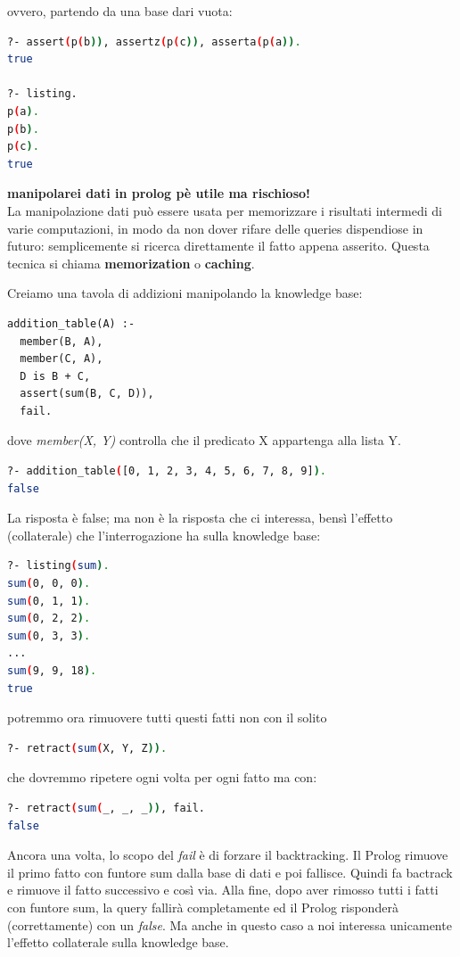 \documentclass[a4paper,12pt, oneside]{book}
\begin{document}
ovvero, partendo da una base dari vuota:
\begin{shaded}
\begin{lstlisting}[language=bash]
?- assert(p(b)), assertz(p(c)), asserta(p(a)).
true

?- listing.
p(a).
p(b).
p(c).
true
\end{lstlisting}
\end{shaded}
\textbf{manipolarei dati in prolog pè utile ma rischioso!}\\
La manipolazione dati può essere usata per memorizzare i risultati
intermedi di varie computazioni, in modo da non dover rifare
delle queries dispendiose in futuro: semplicemente si ricerca
direttamente il fatto appena asserito. Questa tecnica si chiama \textbf{memorization} o \textbf{caching}.
\begin{esempio}
Creiamo una tavola di addizioni manipolando la knowledge base:
\begin{verbatim}
addition_table(A) :-
  member(B, A),
  member(C, A),
  D is B + C,
  assert(sum(B, C, D)),
  fail.
\end{verbatim}
dove \textit{member(X, Y)} controlla che il predicato X appartenga alla lista Y.\\
\begin{shaded}
\begin{lstlisting}[language=bash]
?- addition_table([0, 1, 2, 3, 4, 5, 6, 7, 8, 9]).
false
\end{lstlisting}
\end{shaded}
La risposta è false; ma non è la risposta che ci interessa, bensì
l'effetto (collaterale) che l'interrogazione ha sulla knowledge base:
\begin{shaded}
\begin{lstlisting}[language=bash]
?- listing(sum).
sum(0, 0, 0).
sum(0, 1, 1).
sum(0, 2, 2).
sum(0, 3, 3).
...
sum(9, 9, 18).
true
\end{lstlisting}
\end{shaded}
potremmo ora rimuovere tutti questi fatti non con il solito 
\begin{shaded}
\begin{lstlisting}[language=bash]
?- retract(sum(X, Y, Z)).
\end{lstlisting}
\end{shaded}
che dovremmo ripetere ogni volta per ogni fatto ma con:
\begin{shaded}
\begin{lstlisting}[language=bash]
?- retract(sum(_, _, _)), fail.
false
\end{lstlisting}
\end{shaded}
Ancora una volta, lo scopo del \textit{fail} è di forzare il backtracking. Il Prolog rimuove il primo fatto con funtore sum dalla base di dati e poi fallisce. Quindi fa bactrack e rimuove il fatto successivo e così via. Alla fine, dopo aver rimosso tutti i fatti con funtore sum, la query fallirà completamente ed il Prolog risponderà (correttamente) con un \textit{false}. Ma anche in questo caso a noi interessa unicamente l'effetto collaterale sulla knowledge base.
\end{esempio}
\end{document}

